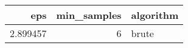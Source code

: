 \begin{tabular}{rrl}
\toprule
eps & min_samples & algorithm \\
\midrule
2.899457 & 6 & brute \\
\bottomrule
\end{tabular}
